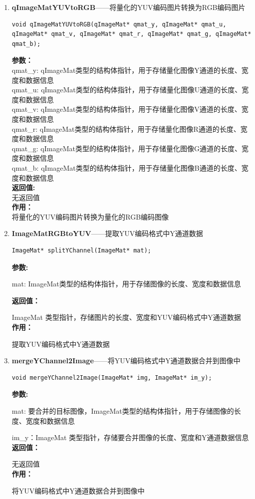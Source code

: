 \documentclass[12pt, a4paper, oneside]{ctexbook}
\begin{document}
\begin{enumerate}
			\item \textbf{qImageMatYUVtoRGB}——将量化的YUV编码图片转换为RGB编码图片
			\begin{lstlisting}
void qImageMatYUVtoRGB(qImageMat* qmat_y, qImageMat* qmat_u, qImageMat* qmat_v, qImageMat* qmat_r, qImageMat* qmat_g, qImageMat* qmat_b);
			\end{lstlisting}
			\textbf{参数：} \\
			qmat\_y: qImageMat类型的结构体指针，用于存储量化图像Y通道的长度、宽度和数据信息 \\ 
			qmat\_u: qImageMat类型的结构体指针，用于存储量化图像U通道的长度、宽度和数据信息 \\
			qmat\_v: qImageMat类型的结构体指针，用于存储量化图像V通道的长度、宽度和数据信息 \\
			qmat\_r: qImageMat类型的结构体指针，用于存储量化图像R通道的长度、宽度和数据信息 \\ 
			qmat\_g: qImageMat类型的结构体指针，用于存储量化图像G通道的长度、宽度和数据信息 \\ 
			qmat\_b: qImageMat类型的结构体指针，用于存储量化图像B通道的长度、宽度和数据信息 \\ 
			\textbf{返回值:} \\ 无返回值 \\
			\textbf{作用：} \\ 将量化的YUV编码图片转换为量化的RGB编码图像
			
			
			\item \textbf{ImageMatRGBtoYUV}——提取YUV编码格式中Y通道数据
			\begin{lstlisting}[numbers=none]
ImageMat* splitYChannel(ImageMat* mat);
			\end{lstlisting}
			\textbf{参数:} \par mat: ImageMat类型的结构体指针，用于存储图像的长度、宽度和数据信息\par 
			\textbf{返回值：}\par ImageMat 类型指针，存储图片的长度、宽度和YUV编码格式中Y通道数据 \\
			\textbf{作用：}\par 提取YUV编码格式中Y通道数据 \\
			
			\item \textbf{mergeYChannel2Image}——将YUV编码格式中Y通道数据合并到图像中
			\begin{lstlisting}[numbers=none]
void mergeYChannel2Image(ImageMat* img, ImageMat* im_y);
			\end{lstlisting}
			\textbf{参数:} \par mat: 要合并的目标图像，ImageMat类型的结构体指针，用于存储图像的长度、宽度和数据信息\par im\_y：ImageMat 类型指针，存储要合并图像的长度、宽度和Y通道数据信息 \\
			\textbf{返回值：}\par 无返回值 \\
			\textbf{作用：}\par 将YUV编码格式中Y通道数据合并到图像中 \\			
			

\end{enumerate}
\end{document}
